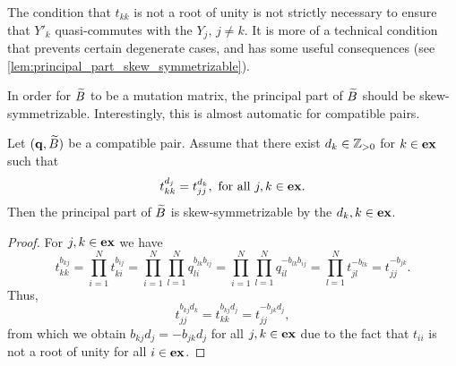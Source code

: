 \begin{remark}
	The condition that $t_{kk}$ is not a root of unity is not strictly necessary to ensure that $Y'_k$ quasi-commutes with the $Y_j,\, j\neq k$. It is more of a technical condition that prevents certain degenerate cases, and has some useful consequences (see \cref{lem:principal_part_skew_symmetrizable}).
\end{remark}
%

In order for $\widetilde{B}$ to be a mutation matrix, the principal part of $\widetilde{B}$ should be
skew-symmetrizable. Interestingly, this is almost automatic for compatible pairs.
\begin{lemma}\label{lem:principal_part_skew_symmetrizable}

	Let $(\mathbf{q}, \widetilde{B})$ be a compatible pair. Assume that there exist $d_k \in \mathbb{Z}_{>0}$ for
	$k \in \mathbf{ex}$ such that
	\begin{equation*}
		t_{kk}^{d_j} = t_{jj}^{d_k}, \text{ for all } j,k \in \mathbf{ex}.
	\end{equation*}
	Then the principal part of $\widetilde{B}$ is skew-symmetrizable by the $d_k, k\in \mathbf{ex}$.
\end{lemma}
\begin{proof}

	For $j,k \in \mathbf{ex}$ we have
	\begin{equation*}
		t_{kk}^{b_{kj}} = \prod_{i=1}^N t_{ki}^{b_{ij}} = \prod_{i=1}^N\prod_{l=1}^N q_{li}^{b_{lk}b_{ij}} =
		\prod_{i=1}^N\prod_{l=1}^N q_{il}^{-b_{lk}b_{ij}} = \prod_{l=1}^N t_{jl}^{-b_{lk}} = t_{jj}^{-b_{jk}}.
	\end{equation*}
	Thus,
	\begin{equation*}
		t_{jj}^{b_{kj} d_k} = t_{kk}^{ b_{kj}d_j} = t_{jj}^{- b_{jk} d_j},
	\end{equation*}
	from which we obtain $b_{kj} d_j = -b_{jk} d_j$ for all $j, k \in \mathbf{ex}$ due to the fact that $t_{ii}$ is not a root of unity for all $i \in \mathbf{ex}$.
\end{proof}

